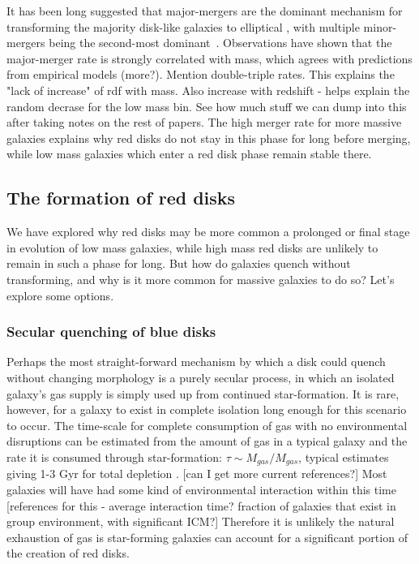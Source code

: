 \documentclass[useAMS,usenatbib]{mn2e}
\begin{document}
It has been long suggested that major-mergers are the dominant mechanism for transforming the majority disk-like galaxies to elliptical \citep{Toomre1977,Schweizer1982,Schweizer1990}, with multiple minor-mergers being the second-most dominant~\citep{Bundy2009a,Hopkins2010b}. Observations have shown that the major-merger rate is strongly correlated with mass, which agrees with predictions from empirical models \citep{Hopkins2010a,Hopkins2010b} (more?). Mention double-triple rates. This explains the "lack of increase" of rdf with mass. Also increase with redshift - helps explain the random decrase for the low mass bin. See how much stuff we can dump into this after taking notes on the rest of papers. The high merger rate for more massive galaxies explains why red disks do not stay in this phase for long before merging, while low mass galaxies which enter a red disk phase remain stable there.

\subsection{The formation of red disks}
We have explored why red disks may be more common a prolonged or final stage in evolution of low mass galaxies, while high mass red disks are unlikely to remain in such a phase for long. But how do galaxies quench without transforming, and why is it more common for massive galaxies to do so? Let's explore some options.

\subsubsection{Secular quenching of blue disks}

Perhaps the most straight-forward mechanism by which a disk could quench without changing morphology is a purely secular process, in which an isolated galaxy's gas supply is simply used up from continued star-formation. It is rare, however, for a galaxy to exist in complete isolation long enough for this scenario to occur. The time-scale for complete consumption of gas with no environmental disruptions can be estimated from the amount of gas in a typical galaxy and the rate it is consumed through star-formation: $\tau \sim M_{gas}/{M}_{gas}$, typical estimates giving 1-3 Gyr for total depletion \citep{Larson1980}. [can I get more current references?]
Most galaxies will have had some kind of environmental interaction within this time [references for this - average interaction time? fraction of galaxies that exist in group environment, with significant ICM?] Therefore it is unlikely the natural exhaustion of gas is star-forming galaxies can account for a significant portion of the creation of red disks.
\end{document}
